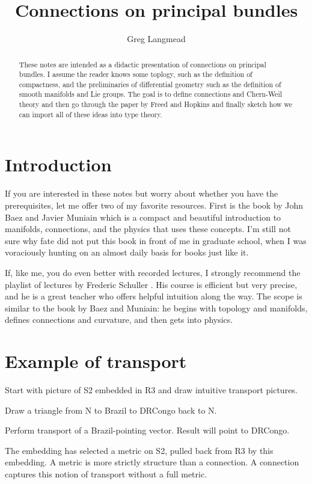 \documentclass[12pt]{article}
\title{Connections on principal bundles}
\author{Greg Langmead}
\begin{document}
\maketitle
\begin{abstract}
These notes are intended as a didactic presentation of connections on principal bundles. I assume the reader knows some toplogy, such as the definition of compactness, and the preliminaries of differential geometry such as the definition of smooth manifolds and Lie groups. The goal is to define connections and Chern-Weil theory and then go through the paper by Freed and Hopkins \cite{freed2013chernweil} and finally sketch how we can import all of these ideas into type theory.
\end{abstract}
\tableofcontents
\section{Introduction}
If you are interested in these notes but worry about whether you have the prerequisites, let me offer two of my favorite resources. First is the book by John Baez and Javier Muniain \cite{baez1994gauge} which is a compact and beautiful introduction to manifolds, connections, and the physics that uses these concepts. I'm still not sure why fate did not put this book in front of me in graduate school, when I was voraciously hunting on an almost daily basis for books just like it.

If, like me, you do even better with recorded lectures, I strongly recommend the playlist of lectures by Frederic Schuller \cite{schullerYoutube2015}. His course is efficient but very precise, and he is a great teacher who offers helpful intuition along the way. The scope is similar to the book by Baez and Muniain: he begins with topology and manifolds, defines connections and curvature, and then gets into physics.

\section{Example of transport}
Start with picture of S2 embedded in R3 and draw intuitive transport pictures.

Draw a triangle from N to Brazil to DRCongo back to N.

Perform transport of a Brazil-pointing vector. Result will point to DRCongo.

The embedding has selected a metric on S2, pulled back from R3 by this embedding. A metric is more strictly structure than a connection. A connection captures this notion of transport without a full metric.
\end{document}
